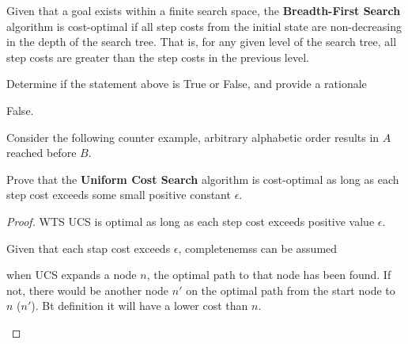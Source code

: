 \begin{listo}
\begin{listo}
        \item Given that a goal exists within a finite search space, the \textbf{Breadth-First Search} algorithm is cost-optimal if all step costs from the initial state are non-decreasing in the depth of the search tree. That is, for any given level of the search tree, all step costs are greater than the step costs in the previous level.

        Determine if the statement above is True or False, and provide a rationale

        \begin{solution}
            False. 
            
            Consider the following counter example, arbitrary alphabetic order results in $A$ reached before $B$. 

            \begin{figure}[ht!]
                \centering

                \tikzexternalenable
                \tikzexternaldisable
            \end{figure}
        \end{solution}
    \end{listo}

    \item Prove that the \textbf{Uniform Cost Search} algorithm is cost-optimal as long as each step cost exceeds some small positive constant $\epsilon$.

    \begin{solution}
        \begin{proof}
            WTS UCS is optimal as long as each step cost exceeds positive value $\epsilon$. 

            Given that each stap cost exceeds $\epsilon$, completenemss can be assumed 

            \begin{listu}
                \item when UCS expands a node $n$, the optimal path to that node has been found. If not, there would be another node $n'$ on the optimal path from the start node to $n$ ($n'$). Bt definition it will have a lower cost than $n$.
                

\end{listu}
\end{proof}
\end{solution}
\end{listo}
